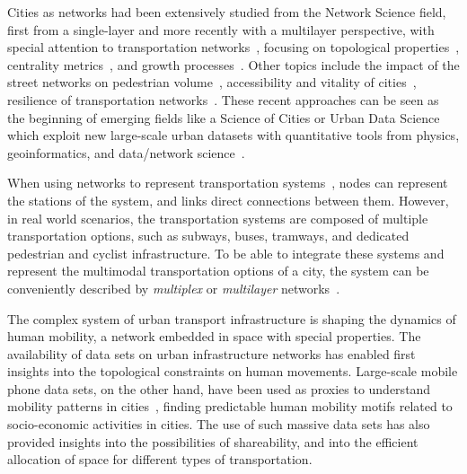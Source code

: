 Cities as networks had been extensively studied from the Network Science field, first from a single-layer and more recently with a multilayer perspective, with special attention to  transportation networks~\cite{lin2013complex,barthelemy2011spatial,ding2019application}, focusing on topological properties~\cite{jiang2004topological,cardillo2006structural,barthelemy2008patterns,batty2008size,barthelemy2011spatial,strano2013comparative,louf2014typology,boeing2020multiscale}, centrality metrics~\cite{crucitti2008centrality,Boeing2020Planarity,kirkley2018structural}, and growth processes~\cite{makse1995growth,strano2012evolution}. Other topics include the impact of the street networks on pedestrian volume~\cite{hajrasouliha2015connectivity}, accessibility and vitality of cities~\cite{denadai2016death,biazzo2019accesibility}, resilience of transportation networks~\cite{baggag2018resilience,ferretti2019resilience}. These recent approaches can be seen as the beginning of emerging fields like a Science of Cities or Urban Data Science which exploit new large-scale urban datasets with quantitative tools from physics, geoinformatics, and data/network science~\cite{batty2013new,resch2019hds}.

When using networks to represent transportation systems~\cite{lin2013complex}, nodes can represent the stations of the system, and links direct connections between them. However, in real world scenarios, the transportation systems are composed of multiple transportation options, such as subways, buses, tramways, and dedicated pedestrian and cyclist infrastructure. To be able to integrate these systems and represent the multimodal transportation options of a city, the system can be conveniently described by \textit{multiplex} or \textit{multilayer} networks~\cite{dedomenico2013mathematical,kivela2014multilayer,boccaletti2014structure,battiston2014structural}.

The complex system of urban transport infrastructure is shaping the dynamics of human mobility, a network embedded in space with special properties. The availability of data sets on urban infrastructure networks has enabled first insights into the topological constraints on human movements. Large-scale mobile phone data sets, on the other hand, have been used as proxies to understand mobility patterns in cities~\cite{gonzalez2008understanding}, finding predictable human mobility motifs related to socio-economic activities in cities. The use of such massive data sets has also provided insights into the possibilities of shareability, and into the efficient allocation of space for different types of transportation.


